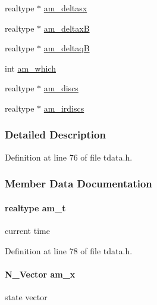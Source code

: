 \begin{DoxyCompactItemize}
\item 
realtype $\ast$ \hyperlink{struct_temp_data_a96e5e38eb662e4b1390a14693e17ece5}{am\+\_\+deltasx}
\item 
realtype $\ast$ \hyperlink{struct_temp_data_a75047d78cee16ec77b9aae2cf0a25964}{am\+\_\+deltax\+B}
\item 
realtype $\ast$ \hyperlink{struct_temp_data_adfe8df7debe43dd76c29e4976b1f1ae7}{am\+\_\+deltaq\+B}
\item 
int \hyperlink{struct_temp_data_a961819e25ceef7e842c469cbedccb19f}{am\+\_\+which}
\item 
realtype $\ast$ \hyperlink{struct_temp_data_aeb8b1beb27f1b20bda3d7de494f58c41}{am\+\_\+discs}
\item 
realtype $\ast$ \hyperlink{struct_temp_data_ad64693949a923975059d0d0c49e854f9}{am\+\_\+irdiscs}
\end{DoxyCompactItemize}


\subsubsection{Detailed Description}


Definition at line 76 of file tdata.\+h.



\subsubsection{Member Data Documentation}
\hypertarget{struct_temp_data_ae0484650df254ad9cd8883e2ba028892}{}
\paragraph[{am\+\_\+t}]{\setlength{\rightskip}{0pt plus 5cm}realtype am\+\_\+t}\label{struct_temp_data_ae0484650df254ad9cd8883e2ba028892}
current time 

Definition at line 78 of file tdata.\+h.

\hypertarget{struct_temp_data_a4527d9abde45ba3982c35d2c12969d36}{}
\paragraph[{am\+\_\+x}]{\setlength{\rightskip}{0pt plus 5cm}N\+\_\+\+Vector am\+\_\+x}\label{struct_temp_data_a4527d9abde45ba3982c35d2c12969d36}
state vector 

